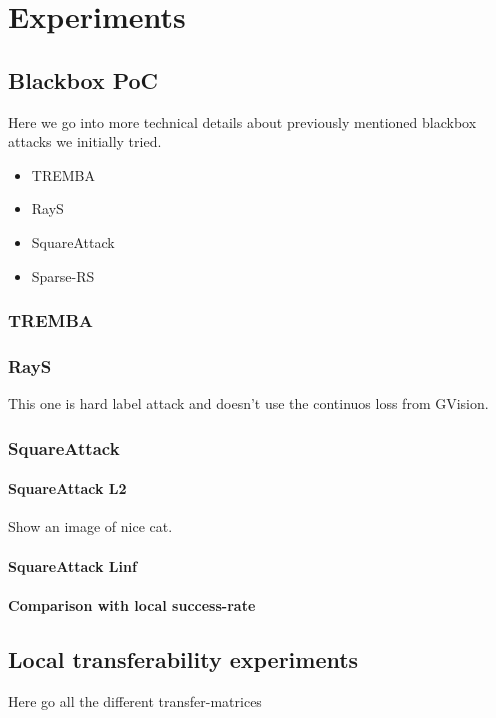 \chapter{Experiments}
\label{experiments_chap}

\section{Blackbox PoC}
Here we go into more technical details about previously mentioned blackbox attacks we initially tried.

\begin{itemize}
    \item TREMBA
    \item RayS
    \item SquareAttack
    \item Sparse-RS
\end{itemize}

\subsection{TREMBA}

\subsection{RayS}
This one is hard label attack and doesn't use the continuos loss from GVision.

\subsection{SquareAttack}

\subsubsection{SquareAttack L2}
Show an image of nice cat.

\subsubsection{SquareAttack Linf}

\subsubsection{Comparison with local success-rate}



\section{Local transferability experiments}
Here go all the different transfer-matrices


